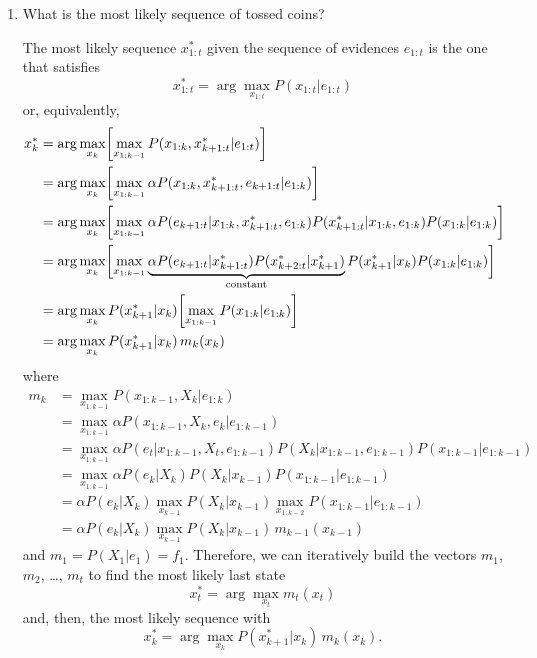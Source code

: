 \documentclass[11pt, a4paper]{article}
\begin{document}
\begin{enumerate}
    \item What is the most likely sequence of tossed coins?

    \begin{solution}
        The most likely sequence $x_{1:t}^*$ given the sequence of evidences $e_{1:t}$ is the one that satisfies
        \begin{equation*}
            x_{1:t}^* = \arg \max_{x_{1:t}} P(x_{1:t} | e_{1:t})
        \end{equation*}
        or, equivalently,
        \begin{align*}
            x_k^* & = \arg \max_{x_k} \sbk*{ \max_{x_{1:k-1}} P(x_{1:k}, x^*_{k+1:t} | e_{1:t}) } \\
            & = \arg \max_{x_k} \sbk*{ \max_{x_{1:k-1}} \alpha P(x_{1:k}, x^*_{k+1:t}, e_{k+1:t} | e_{1:k}) } \\
            & = \arg \max_{x_k} \sbk*{ \max_{x_{1:k-1}} \alpha P(e_{k+1:t} | x_{1:k}, x^*_{k+1:t}, e_{1:k}) P(x^*_{k+1:t} | x_{1:k}, e_{1:k}) P(x_{1:k} | e_{1:k}) } \\
            & = \arg \max_{x_k} \sbk[\bigg]{ \max_{x_{1:k-1}} \underbrace{\alpha P(e_{k+1:t} | x^*_{k+1:t}) P(x^*_{k+2:t} | x^*_{k+1})}_{\text{constant}} P(x^*_{k+1} | x_{k}) P(x_{1:k} | e_{1:k}) } \\
            & = \arg \max_{x_k} P(x^*_{k+1} | x_{k}) \sbk*{ \max_{x_{1:k-1}} P(x_{1:k} | e_{1:k}) } \\
            & = \arg \max_{x_k} P(x^*_{k+1} | x_{k}) \, m_k(x_k)
        \end{align*}
        where
        \begin{align*}
            m_k & = \max_{x_{1:k-1}} P(x_{1:k-1}, X_k | e_{1:k}) \\
            & = \max_{x_{1:k-1}} \alpha P(x_{1:k-1}, X_k, e_k | e_{1:k-1}) \\
            & = \max_{x_{1:k-1}} \alpha P(e_t | x_{1:k-1}, X_t, e_{1:k-1}) P(X_k | x_{1:k-1}, e_{1:k-1}) P(x_{1:k-1} | e_{1:k-1}) \\
            & = \max_{x_{1:k-1}} \alpha P(e_k | X_k) P(X_k | x_{k-1}) P(x_{1:k-1} | e_{1:k-1}) \\
            & = \alpha P(e_k | X_k) \max_{x_{k-1}} P(X_k | x_{k-1}) \max_{x_{1:k - 2}} P(x_{1:k-1} | e_{1:k-1}) \\
            & = \alpha P(e_k | X_k) \max_{x_{k-1}} P(X_k | x_{k-1}) \, m_{k-1}(x_{k-1})
        \end{align*}
        and $m_1 = P(X_1 | e_1) = f_1$. Therefore, we can iteratively build the vectors $m_1$, $m_2$, \dots, $m_t$ to find the most likely last state
        \begin{equation*}
            x_t^* = \arg \max_{x_t} m_t(x_t)
        \end{equation*}
        and, then, the most likely sequence with
        \begin{equation*}
            x_k^* = \arg \max_{x_k} P(x^*_{k + 1} | x_k) \, m_k(x_k) .
        \end{equation*}
    \end{solution}

\end{enumerate}
\end{document}
